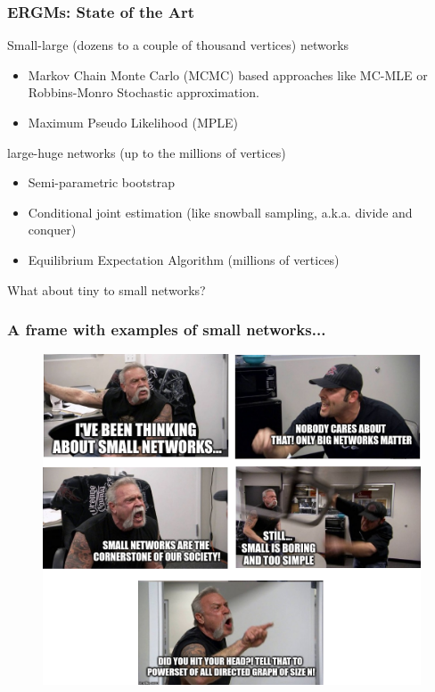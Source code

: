 \documentclass[aspectratio=169, 10pt]{beamer}\usepackage[]{graphicx}\usepackage[]{color}
\begin{document}
\hyperlink{ergmterms}{}

\begin{frame}[label=art]
\frametitle{ERGMs: State of the Art}
\pause
Small-large (dozens to a couple of thousand vertices) networks

\begin{itemize}
\item Markov Chain Monte Carlo (MCMC) based approaches like MC-MLE or Robbins-Monro Stochastic approximation. \hyperlink{mcmle}{}
\item Maximum Pseudo Likelihood (MPLE)
\end{itemize}\pause

large-huge networks (up to the millions of vertices)

\begin{itemize}
\item Semi-parametric bootstrap
\item Conditional joint estimation (like snowball sampling, a.k.a. divide and conquer)
\item Equilibrium Expectation Algorithm (millions of vertices)
\end{itemize}\pause

What about tiny to small networks?

\end{frame}

\begin{frame}
\frametitle{A frame with examples of small networks...}
\begin{figure}
\centering
\includegraphics[width=.6\linewidth]{american-chopper-argument-ergmitos.png}
\end{figure}
\end{frame}
\end{document}
